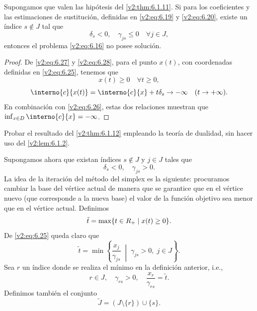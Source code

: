 \begin{theorem}\label{v2:thm:6.1.12}
    Supongamos que valen las hipótesis del \cref{v2:thm:6.1.11}. Si para los coeficientes y las estimaciones de sustitución, definidas en \eqref{v2:eq:6.19} y \eqref{v2:eq:6.20}, existe un índice $s \notin J$ tal que
    \begin{equation}
        \delta_s < 0, \quad \gamma_{js} \le 0 \quad \forall j \in J,
        \label{v2:eq:6.28}
    \end{equation}
    entonces el problema \eqref{v2:eq:6.16} no posee solución.
\end{theorem}

\begin{proof}
    De \eqref{v2:eq:6.27} y \eqref{v2:eq:6.28}, para el punto $x(t)$, con coordenadas definidas en \eqref{v2:eq:6.25}, tenemos que
    \[
        x(t) \ge 0 \quad \forall t \ge 0,
    \]
    \[
        \interno{c}{x(t)} = \interno{c}{x} + t \delta_s \to -\infty \quad (t \to +\infty).
    \]
    En combinación con \eqref{v2:eq:6.26}, estas dos relaciones muestran que $\inf_{x \in D} \interno{c}{x} = -\infty$.
\end{proof}

\begin{exercise}\label{v2:ejer:6.1.11}
    Probar el resultado del \cref{v2:thm:6.1.12} empleando la teoría de dualidad, sin hacer uso del \cref{v2:lem:6.1.2}.
\end{exercise}

Supongamos ahora que existan índices $s \notin J$ y $j \in J$ tales que
\begin{equation}
    \delta_s < 0, \quad \gamma_{js} > 0.
    \label{v2:eq:6.29}
\end{equation}
La idea de la iteración del método del simplex es la siguiente: procuramos cambiar la base del vértice actual de manera que se garantice que en el vértice nuevo (que corresponde a la nueva base) el valor de la función objetivo sea menor que en el vértice actual. Definimos
\begin{equation}
    \tilde{t} = \max \{ t \in R_+ \mid x(t) \ge 0 \}.
    \label{v2:eq:6.30}
\end{equation}
De \eqref{v2:eq:6.25} queda claro que
\begin{equation}
    \tilde{t} = \min \left\{ \frac{x_j}{\gamma_{js}} \;\middle|\; \gamma_{js} > 0, \; j \in J \right\}.
    \label{v2:eq:6.31}
\end{equation}
Sea $r$ un índice donde se realiza el mínimo en la definición anterior, i.e.,
\begin{equation}
    r \in J, \quad \gamma_{rs} > 0, \quad \frac{x_r}{\gamma_{rs}} = \tilde{t}.
    \label{v2:eq:6.32}
\end{equation}
Definimos también el conjunto
\begin{equation}
    \tilde{J} = (J \setminus \{r\}) \cup \{s\}.
    \label{v2:eq:6.33}
\end{equation}

